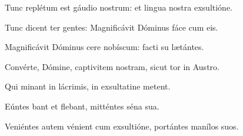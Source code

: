 \item {}

\item Tunc replétum est gáudio  nostrum:\psstar{} et lingua nostra exsultióne.

\item Tunc dicent ter gentes:\psstar{} Magnificávit Dóminus fáce cum eis.

\item Magnificávit Dóminus cere nobíscum:\psstar{} facti su lætántes.

\item Convérte, Dómine, captivitem nostram,\psstar{} sicut tor in Austro.

\item Qui minant in lácrimis,\psstar{} in exsultatine metent.

\item Eúntes bant et flebant,\psstar{} mitténtes séna sua.

\item Veniéntes autem vénient cum exsultióne,\psstar{} portántes manílos suos.

